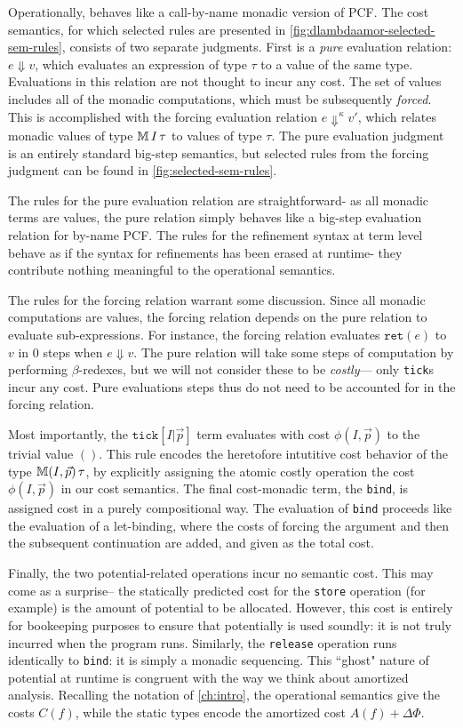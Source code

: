 Operationally, \dlambdaamor behaves like a call-by-name monadic version of PCF. The cost semantics, for which selected rules are presented in \autoref{fig:dlambdaamor-selected-sem-rules}, consists of two separate judgments. First is a \textit{pure} evaluation relation: $e \Downarrow v$, which evaluates an expression of type $\tau$ to a value of the same type. Evaluations in this relation are not thought to incur any cost. The set of values includes all of the monadic computations, which must be subsequently \textit{forced}. This is accomplished with the forcing evaluation relation $e \Downarrow^\kappa v'$, which relates monadic values of type $\mathbb{M} \, I \, \tau$ to values of type $\tau$. The pure evaluation judgment is an entirely standard big-step semantics, but selected rules from the forcing judgment can be found in \autoref{fig:selected-sem-rules}.

The rules for the pure evaluation relation are straightforward- as all monadic terms are values, the pure relation simply behaves like a big-step evaluation relation for by-name PCF. The rules for the refinement syntax at term level behave as if the syntax for refinements has been erased at runtime- they contribute nothing meaningful to the operational semantics.

The rules for the forcing relation warrant some discussion. Since all monadic computations are values, the forcing relation depends on the pure relation to evaluate sub-expressions. For instance, the forcing relation evaluates $\texttt{ret}(e)$ to $v$ in $0$ steps when $e \Downarrow v$. The pure relation will take some steps of computation by performing $\beta$-redexes, but we will not consider these to be \textit{costly}--- only \texttt{tick}s incur any cost. Pure evaluations steps thus do not need to be accounted for in the forcing relation.

Most importantly, the $\texttt{tick}[I|\vec{p}]$ term evaluates with cost $\phi(I,\vec{p})$ to the trivial value $()$. This rule encodes the heretofore intutitive cost behavior of the type $\mathbb{M} (I,\vec{p}) \, \tau$, by explicitly assigning the atomic costly operation the cost $\phi(I,\vec{p})$ in our cost semantics.  The final cost-monadic term, the \texttt{bind}, is assigned cost in a purely compositional way. The evaluation of \texttt{bind} proceeds like the evaluation of a let-binding, where the costs of forcing the argument and then the subsequent continuation are added, and given as the total cost.

Finally, the two potential-related operations incur no semantic cost. This may come as a surprise-- the statically predicted cost for the \texttt{store} operation (for example) is the amount of potential to be allocated. However, this cost is entirely for bookeeping purposes to ensure that potentially is used soundly: it is not truly incurred when the program runs. Similarly, the \texttt{release} operation runs identically to \texttt{bind}: it is simply a monadic sequencing. This ``ghost" nature of potential at runtime is congruent with the way we think about amortized analysis. Recalling the notation of \autoref{ch:intro}, the operational semantics give the costs $C(f)$, while the static types encode the amortized cost $A(f) + \Delta\Phi$.

